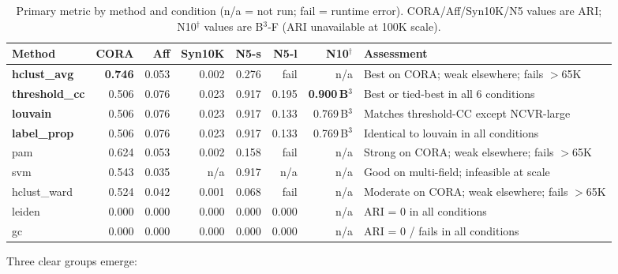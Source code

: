 \documentclass[11pt, a4paper]{article}
\newcommand{\good}[1]{{\color{good}\textbf{#1}}}
\begin{document}
\begin{table}[h!]
\centering
\small
\begin{tabularx}{\linewidth}{lrrrrrrW}
\toprule
\textbf{Method} & \textbf{CORA} & \textbf{Aff} & \textbf{Syn10K} &
\textbf{N5-s} & \textbf{N5-l} & \textbf{N10$^\dagger$} & \textbf{Assessment} \\
\midrule
\textbf{hclust\_avg}    & \good{0.746} & 0.053 & 0.002 & 0.276 & fail  & n/a  & Best on CORA; weak elsewhere; fails $>$65K \\
\textbf{threshold\_cc} & 0.506 & 0.076 & 0.023 & 0.917 & 0.195 & \good{0.900\,B$^3$} & Best or tied-best in all 6 conditions \\
\textbf{louvain}       & 0.506 & 0.076 & 0.023 & 0.917 & 0.133 & 0.769\,B$^3$ & Matches threshold-CC except NCVR-large \\
\textbf{label\_prop}   & 0.506 & 0.076 & 0.023 & 0.917 & 0.133 & 0.769\,B$^3$ & Identical to louvain in all conditions \\
pam                    & 0.624 & 0.053 & 0.002 & 0.158 & fail  & n/a  & Strong on CORA; weak elsewhere; fails $>$65K \\
svm                    & 0.543 & 0.035 & n/a   & 0.917 & n/a   & n/a  & Good on multi-field; infeasible at scale \\
hclust\_ward           & 0.524 & 0.042 & 0.001 & 0.068 & fail  & n/a  & Moderate on CORA; weak elsewhere; fails $>$65K \\
leiden                 & 0.000 & 0.000 & 0.000 & 0.000 & 0.000 & n/a  & ARI = 0 in all conditions \\
gc                     & 0.000 & 0.000 & 0.000 & 0.000 & 0.000 & n/a  & ARI = 0 / fails in all conditions \\
\bottomrule
\end{tabularx}
\caption{Primary metric by method and condition (n/a = not run; fail = runtime error).
CORA/Aff/Syn10K/N5 values are ARI; N10$^\dagger$ values are B$^3$-F (ARI unavailable at 100K scale).}
\end{table}

Three clear groups emerge:
\end{document}
